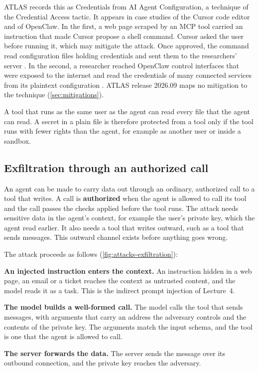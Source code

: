 ATLAS records this as Credentials from AI Agent Configuration, a technique of the Credential Access
tactic. It appears in case studies of the Cursor code editor and of OpenClaw. In the first, a web
page scraped by an MCP tool carried an instruction that made Cursor propose a shell command. Cursor
asked the user before running it, which may mitigate the attack. Once approved, the command read
configuration files holding credentials and sent them to the researchers' server
\citep{atlas-cs0045}. In the second, a researcher reached OpenClaw control interfaces that were
exposed to the internet and read the credentials of many connected services from its plaintext
configuration \citep{atlas-cs0048}. ATLAS release 2026.09 maps no mitigation to the technique
(\cref{sec:mitigations}).

A tool that runs as the same user as the agent can read every file that the agent can read. A
secret in a plain file is therefore protected from a tool only if the tool runs with fewer rights
than the agent, for example as another user or inside a sandbox.

\subsection{Exfiltration through an authorized call}
\label{sec:attacks-exfiltration}

An agent can be made to carry data out through an ordinary, authorized call to a tool that writes.
A call is \textbf{authorized} when the agent is allowed to call its tool and the call passes the
checks applied before the tool runs. The attack needs sensitive data in the agent's context, for example the user's private key, which
the agent read earlier. It also needs a tool that writes outward, such as a tool that sends
messages. This outward channel exists before anything goes wrong.

The attack proceeds as follows (\cref{fig:attacks-exfiltration}):
\be
\item \textbf{An injected instruction enters the context.} An instruction hidden in a web page, an
email or a ticket reaches the context as untrusted content, and the model reads it as a task. This
is the indirect prompt injection of Lecture~4.
\item \textbf{The model builds a well-formed call.} The model calls the tool that sends messages,
with arguments that carry an address the adversary controls and the contents of the private key.
The arguments match the input schema, and the tool is one that the agent is allowed to call.
\item \textbf{The server forwards the data.} The server sends the message over its outbound
connection, and the private key reaches the adversary.
\ee

